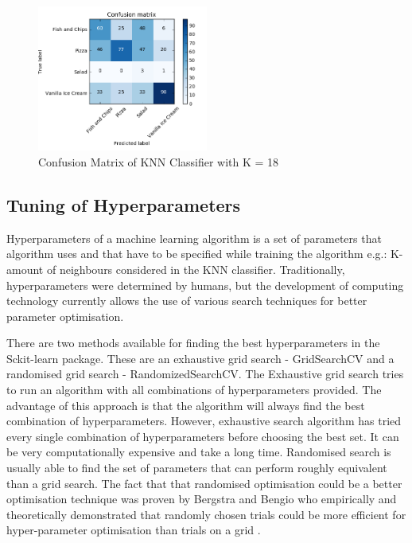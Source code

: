\begin{figure}[h]
\centering
\includegraphics[width=0.5\textwidth]{Figures/conf_k-18.PNG}
\caption{Confusion Matrix of KNN Classifier with K = 18}
\label{fig:k18}
\end{figure}




\subsection{Tuning of Hyperparameters}
Hyperparameters of a machine learning algorithm is a set of parameters that algorithm uses and that have to be specified while training the algorithm e.g.: K- amount of neighbours considered in the KNN classifier. Traditionally, hyperparameters were determined by humans, but the development of computing technology currently allows the use of various search techniques for better parameter optimisation.

There are two methods available for finding the best hyperparameters in the Sckit-learn package. These are an exhaustive grid search - GridSearchCV and a randomised grid search - RandomizedSearchCV.  The Exhaustive grid search tries to run an algorithm with all combinations of hyperparameters provided. The advantage of this approach is that the algorithm will always find the best combination of hyperparameters. However, exhaustive search algorithm has tried every single combination of hyperparameters before choosing the best set. It can be very computationally expensive and take a long time. Randomised search is usually able to find the set of parameters that can perform roughly equivalent than a grid search. The fact that that randomised optimisation could be a better optimisation technique was proven by Bergstra and Bengio who empirically and theoretically demonstrated that randomly chosen trials could be more efficient for hyper-parameter optimisation than trials on a grid \cite{bergstra2012random}.

